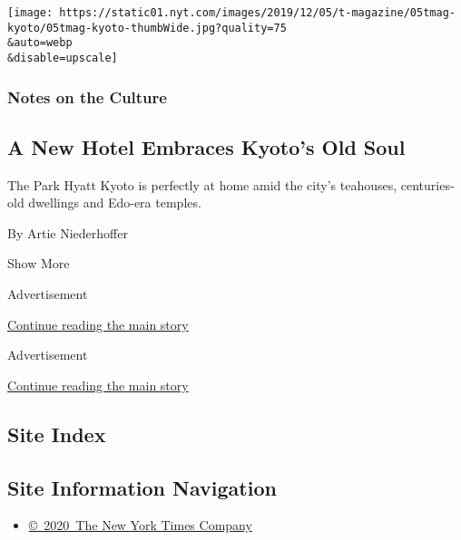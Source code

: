 \begin{enumerate}
  \texttt{[image: https://static01.nyt.com/images/2019/12/05/t-magazine/05tmag-kyoto/05tmag-kyoto-thumbWide.jpg?quality=75\\\&auto=webp\\\&disable=upscale]}

  \hypertarget{notes-on-the-culture-1}{%
  \subsubsection{Notes on the Culture}\label{notes-on-the-culture-1}}

  \hypertarget{a-new-hotel-embraces-kyotos-old-soul}{%
  \subsection{A New Hotel Embraces Kyoto's Old
  Soul}\label{a-new-hotel-embraces-kyotos-old-soul}}

  The Park Hyatt Kyoto is perfectly at home amid the city's teahouses,
  centuries-old dwellings and Edo-era temples.

  By Artie Niederhoffer
\end{enumerate}

Show More

Advertisement

\protect\hyperlink{after-mid2}{Continue reading the main story}

Advertisement

\protect\hyperlink{after-mktg}{Continue reading the main story}

\hypertarget{site-index}{%
\subsection{Site Index}\label{site-index}}

\hypertarget{site-information-navigation}{%
\subsection{Site Information
Navigation}\label{site-information-navigation}}

\begin{itemize}
\tightlist
\item
  \href{https://help.nytimes.com/hc/en-us/articles/115014792127-Copyright-notice}{©~2020~The
  New York Times Company}
\end{itemize}

